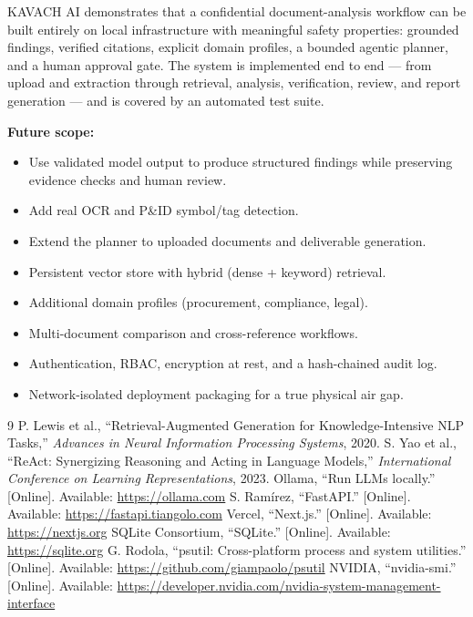 \documentclass[11pt,a4paper]{article}
\newcommand{\projectname}{KAVACH AI}
\begin{document}
\projectname{} demonstrates that a confidential document-analysis workflow can
be built entirely on local infrastructure with meaningful safety properties:
grounded findings, verified citations, explicit domain profiles, a bounded
agentic planner, and a human approval gate. The system is implemented end to
end --- from upload and extraction through retrieval, analysis, verification,
review, and report generation --- and is covered by an automated test suite.

\noindent\textbf{Future scope:}
\begin{itemize}[leftmargin=1.4em]
  \item Use validated model output to produce structured findings while
        preserving evidence checks and human review.
  \item Add real OCR and P\&ID symbol/tag detection.
  \item Extend the planner to uploaded documents and deliverable generation.
  \item Persistent vector store with hybrid (dense + keyword) retrieval.
  \item Additional domain profiles (procurement, compliance, legal).
  \item Multi-document comparison and cross-reference workflows.
  \item Authentication, RBAC, encryption at rest, and a hash-chained audit
        log.
  \item Network-isolated deployment packaging for a true physical air gap.
\end{itemize}

\begin{thebibliography}{9}
 P. Lewis et al., ``Retrieval-Augmented Generation for
Knowledge-Intensive NLP Tasks,'' \emph{Advances in Neural Information
Processing Systems}, 2020.
 S. Yao et al., ``ReAct: Synergizing Reasoning and Acting in
Language Models,'' \emph{International Conference on Learning Representations},
2023.
 Ollama, ``Run LLMs locally.'' [Online].
Available: \url{https://ollama.com}
 S. Ram\'irez, ``FastAPI.'' [Online].
Available: \url{https://fastapi.tiangolo.com}
 Vercel, ``Next.js.'' [Online].
Available: \url{https://nextjs.org}
 SQLite Consortium, ``SQLite.'' [Online].
Available: \url{https://sqlite.org}
 G. Rodola, ``psutil: Cross-platform process and system
utilities.'' [Online]. Available: \url{https://github.com/giampaolo/psutil}
 NVIDIA, ``nvidia-smi.'' [Online].
Available: \url{https://developer.nvidia.com/nvidia-system-management-interface}
\end{thebibliography}
\end{document}
